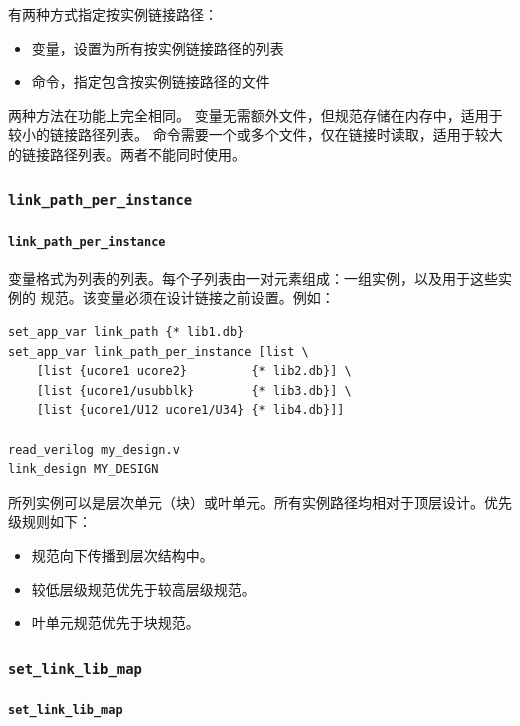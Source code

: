 有两种方式指定按实例链接路径：
\begin{itemize}
  \item {} 变量，设置为所有按实例链接路径的列表
  \item {} 命令，指定包含按实例链接路径的文件
\end{itemize}

两种方法在功能上完全相同。 变量无需额外文件，但规范存储在内存中，适用于较小的链接路径列表。 命令需要一个或多个文件，仅在链接时读取，适用于较大的链接路径列表。两者不能同时使用。

\subsubsection{\texttt{link\_path\_per\_instance}}
\paragraph*{\texttt{link\_path\_per\_instance}}

 变量格式为列表的列表。每个子列表由一对元素组成：一组实例，以及用于这些实例的  规范。该变量必须在设计链接之前设置。例如：
\begin{lstlisting}
set_app_var link_path {* lib1.db}
set_app_var link_path_per_instance [list \
    [list {ucore1 ucore2}         {* lib2.db}] \
    [list {ucore1/usubblk}        {* lib3.db}] \
    [list {ucore1/U12 ucore1/U34} {* lib4.db}]]

read_verilog my_design.v
link_design MY_DESIGN
\end{lstlisting}

所列实例可以是层次单元（块）或叶单元。所有实例路径均相对于顶层设计。优先级规则如下：
\begin{itemize}
  \item 规范向下传播到层次结构中。
  \item 较低层级规范优先于较高层级规范。
  \item 叶单元规范优先于块规范。
\end{itemize}

\subsubsection{\texttt{set\_link\_lib\_map}}
\paragraph*{\texttt{set\_link\_lib\_map}}

